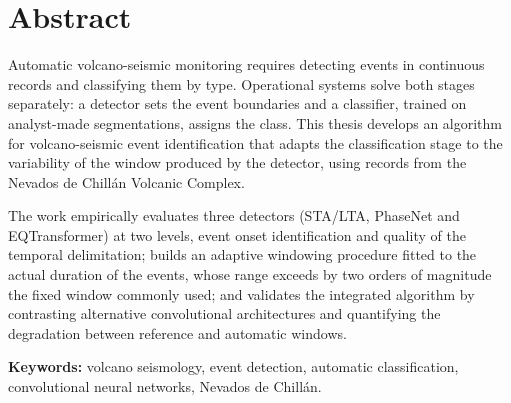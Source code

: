 \chapter*{Abstract}

Automatic volcano-seismic monitoring requires detecting events in
continuous records and classifying them by type. Operational systems solve
both stages separately: a detector sets the event boundaries and a
classifier, trained on analyst-made segmentations, assigns the class. This
thesis develops an algorithm for volcano-seismic event identification that
adapts the classification stage to the variability of the window produced
by the detector, using records from the Nevados de Chillán Volcanic
Complex.

The work empirically evaluates three detectors (STA/LTA, PhaseNet and
EQTransformer) at two levels, event onset identification and quality of the
temporal delimitation; builds an adaptive windowing procedure fitted to the
actual duration of the events, whose range exceeds by two orders of
magnitude the fixed window commonly used; and validates the integrated
algorithm by contrasting alternative convolutional architectures and
quantifying the degradation between reference and automatic windows.

\vspace{1cm}
\noindent\textbf{Keywords:} volcano seismology, event detection, automatic
classification, convolutional neural networks, Nevados de Chillán.